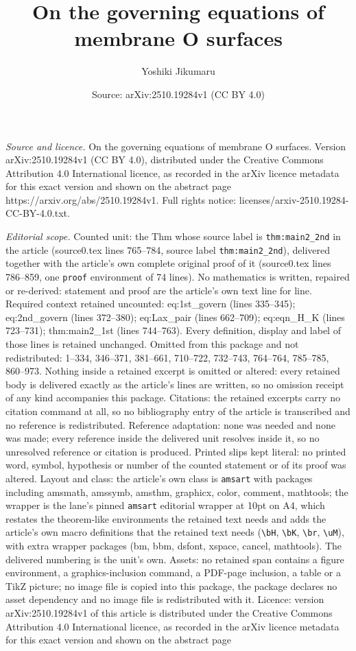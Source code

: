 \documentclass[10pt,a4paper]{amsart}
\title[On the governing equations of membrane O surfaces]{On the governing equations of membrane O surfaces}
\author{Yoshiki Jikumaru}
\date{Source: arXiv:2510.19284v1 (CC BY 4.0)}
\begin{document}
\maketitle

\noindent\emph{Source and licence.} On the governing equations of membrane O surfaces. Version arXiv:2510.19284v1 (CC BY 4.0), distributed under the Creative Commons Attribution 4.0 International licence, as recorded in the arXiv licence metadata for this exact version and shown on the abstract page https://arxiv.org/abs/2510.19284v1. Full rights notice: licenses/arxiv-2510.19284-CC-BY-4.0.txt.\par\smallskip

\noindent\textit{Editorial scope.} Counted unit: the Thm whose source label is \texttt{thm:main2\_2nd} in the article (source0.tex lines 765--784, source label \texttt{thm:main2\_2nd}), delivered together with the article's own complete original proof of it (source0.tex lines 786--859, one \texttt{proof} environment of 74 lines). No mathematics is written, repaired or re-derived: statement and proof are the article's own text line for line. Required context retained uncounted: eq:1st\_govern (lines 335--345); eq:2nd\_govern (lines 372--380); eq:Lax\_pair (lines 662--709); eq:eqn\_H\_K (lines 723--731); thm:main2\_1st (lines 744--763). Every definition, display and label of those lines is retained unchanged. Omitted from this package and not redistributed: 1--334, 346--371, 381--661, 710--722, 732--743, 764--764, 785--785, 860--973. Nothing inside a retained excerpt is omitted or altered: every retained body is delivered exactly as the article's lines are written, so no omission receipt of any kind accompanies this package. Citations: the retained excerpts carry no citation command at all, so no bibliography entry of the article is transcribed and no reference is redistributed. Reference adaptation: none was needed and none was made; every reference inside the delivered unit resolves inside it, so no unresolved reference or citation is produced. Printed slips kept literal: no printed word, symbol, hypothesis or number of the counted statement or of its proof was altered. Layout and class: the article's own class is \texttt{amsart} with packages including amsmath, amssymb, amsthm, graphicx, color, comment, mathtools; the wrapper is the lane's pinned \texttt{amsart} editorial wrapper at 10pt on A4, which restates the theorem-like environments the retained text needs and adds the article's own macro definitions that the retained text needs (\texttt{\textbackslash bH}, \texttt{\textbackslash bK}, \texttt{\textbackslash br}, \texttt{\textbackslash uM}), with extra wrapper packages (bm, bbm, dsfont, xspace, cancel, mathtools). The delivered numbering is the unit's own. Assets: no retained span contains a figure environment, a graphics-inclusion command, a PDF-page inclusion, a table or a TikZ picture; no image file is copied into this package, the package declares no asset dependency and no image file is redistributed with it. Licence: version arXiv:2510.19284v1 of this article is distributed under the Creative Commons Attribution 4.0 International licence, as recorded in the arXiv licence metadata for this exact version and shown on the abstract page 
\end{document}
